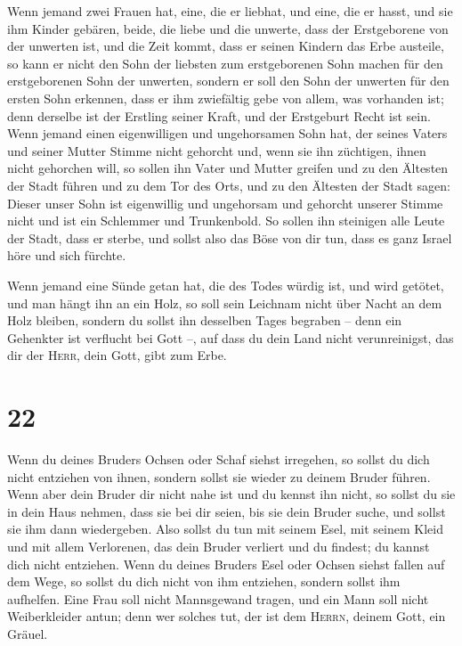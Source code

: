 Wenn jemand zwei Frauen hat, eine, die er liebhat, und
eine, die er hasst, und sie ihm Kinder gebären, beide, die liebe und die
unwerte, dass der Erstgeborene von der unwerten ist,  und
die Zeit kommt, dass er seinen Kindern das Erbe austeile, so kann er
nicht den Sohn der liebsten zum erstgeborenen Sohn machen für den
erstgeborenen Sohn der unwerten,  sondern er soll den
Sohn der unwerten für den ersten Sohn erkennen, dass er ihm zwiefältig
gebe von allem, was vorhanden ist; denn derselbe ist der Erstling seiner
Kraft, und der Erstgeburt Recht ist sein.  Wenn jemand
einen eigenwilligen und ungehorsamen Sohn hat, der seines Vaters und
seiner Mutter Stimme nicht gehorcht und, wenn sie ihn züchtigen, ihnen
nicht gehorchen will,  so sollen ihn Vater und Mutter
greifen und zu den Ältesten der Stadt führen und zu dem Tor des Orts,
 und zu den Ältesten der Stadt sagen: Dieser unser Sohn
ist eigenwillig und ungehorsam und gehorcht unserer Stimme nicht und ist
ein Schlemmer und Trunkenbold.  So sollen ihn steinigen
alle Leute der Stadt, dass er sterbe, und sollst also das Böse von dir
tun, dass es ganz Israel höre und sich fürchte.

 Wenn jemand eine Sünde getan hat, die des Todes würdig
ist, und wird getötet, und man hängt ihn an ein Holz,  so
soll sein Leichnam nicht über Nacht an dem Holz bleiben, sondern du
sollst ihn desselben Tages begraben -- denn ein Gehenkter ist verflucht
bei Gott --, auf dass du dein Land nicht verunreinigst, das dir der
\textsc{Herr}, dein Gott, gibt zum Erbe.

\hypertarget{section-21}{%
\section{22}\label{section-21}}

 Wenn du deines Bruders Ochsen oder Schaf siehst
irregehen, so sollst du dich nicht entziehen von ihnen, sondern sollst
sie wieder zu deinem Bruder führen.  Wenn aber dein Bruder
dir nicht nahe ist und du kennst ihn nicht, so sollst du sie in dein
Haus nehmen, dass sie bei dir seien, bis sie dein Bruder suche, und
sollst sie ihm dann wiedergeben.  Also sollst du tun mit
seinem Esel, mit seinem Kleid und mit allem Verlorenen, das dein Bruder
verliert und du findest; du kannst dich nicht entziehen. 
Wenn du deines Bruders Esel oder Ochsen siehst fallen auf dem Wege, so
sollst du dich nicht von ihm entziehen, sondern sollst ihm aufhelfen.
 Eine Frau soll nicht Mannsgewand tragen, und ein Mann
soll nicht Weiberkleider antun; denn wer solches tut, der ist dem
\textsc{Herrn}, deinem Gott, ein Gräuel.

